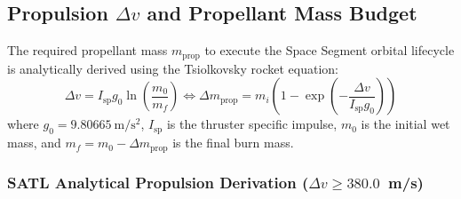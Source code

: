 \subsection{Propulsion $\Delta v$ and Propellant Mass Budget}
\label{sec:propulsion_budget}

The required propellant mass $m_{\text{prop}}$ to execute the Space Segment orbital lifecycle is analytically derived using the Tsiolkovsky rocket equation:
\begin{equation}
    \Delta v = I_{\text{sp}} g_0 \ln\left(\frac{m_0}{m_f}\right) \iff \Delta m_{\text{prop}} = m_i \left(1 - \exp\left(-\frac{\Delta v}{I_{\text{sp}} g_0}\right)\right)
    \label{eq:tsiolkovsky}
\end{equation}
where $g_0 = 9.80665~\mathrm{m/s^2}$, $I_{\text{sp}}$ is the thruster specific impulse, $m_0$ is the initial wet mass, and $m_f = m_0 - \Delta m_{\text{prop}}$ is the final burn mass.

\subsubsection{SATL Analytical Propulsion Derivation ($\Delta v \ge 380.0$~m/s)}

